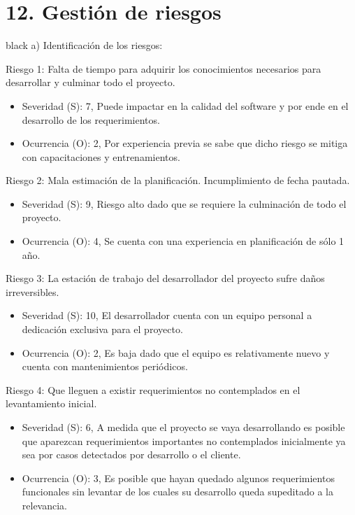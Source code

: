 \documentclass[11pt]{charter}
\begin{document}
\section{12. Gestión de riesgos}
\label{sec:riesgos}

\begin{consigna}{black}
a) Identificación de los riesgos:

Riesgo 1: Falta de tiempo para adquirir los conocimientos necesarios para desarrollar y culminar todo el proyecto.
\begin{itemize}
\item Severidad (S): 7, Puede impactar en la calidad del software y por ende en el desarrollo de los requerimientos.
\item Ocurrencia (O): 2, Por experiencia previa se sabe que dicho riesgo se mitiga con capacitaciones y entrenamientos.
\end{itemize}
		
Riesgo 2: Mala estimación de la planificación. Incumplimiento de fecha pautada.
\begin{itemize}
\item Severidad (S): 9, Riesgo alto dado que se requiere la culminación de todo el proyecto.
\item Ocurrencia (O): 4, Se cuenta con una experiencia en planificación de sólo 1 año.
\end{itemize}
		
Riesgo 3: La estación de trabajo del desarrollador del proyecto sufre daños irreversibles.  
\begin{itemize}
\item Severidad (S): 10, El desarrollador cuenta con un equipo personal a dedicación exclusiva para el proyecto.
\item Ocurrencia (O): 2, Es baja dado que el equipo es relativamente nuevo y cuenta con mantenimientos periódicos.
\end{itemize}

Riesgo 4: Que lleguen a existir requerimientos no contemplados en el levantamiento inicial.  
\begin{itemize}
\item Severidad (S): 6, A medida que el proyecto se vaya desarrollando es posible que aparezcan requerimientos importantes no contemplados inicialmente ya sea por casos detectados por desarrollo o el cliente.
\item Ocurrencia (O): 3, Es posible que hayan quedado algunos requerimientos funcionales sin levantar de los cuales su desarrollo queda supeditado a la relevancia.
\end{itemize}		


\end{consigna}
\end{document}
